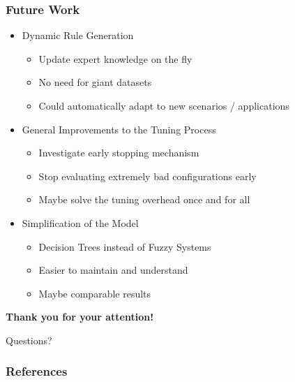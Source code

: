 \documentclass[
	10pt,
	t		%
]{beamer}
\begin{document}
\begin{frame}
	\frametitle{Future Work}
	\begin{itemize}
		\item Dynamic Rule Generation
		      \begin{itemize}
			      \item Update expert knowledge on the fly
			      \item No need for giant datasets
			      \item Could automatically adapt to new scenarios / applications
		      \end{itemize}
		\item General Improvements to the Tuning Process
		      \begin{itemize}
			      \item Investigate early stopping mechanism
			      \item Stop evaluating extremely bad configurations early
			      \item Maybe solve the tuning overhead once and for all
		      \end{itemize}
		\item Simplification of the Model
		      \begin{itemize}
			      \item Decision Trees instead of Fuzzy Systems
			      \item Easier to maintain and understand
			      \item Maybe comparable results
		      \end{itemize}
	\end{itemize}
\end{frame}


\begin{frame}
	\begin{center}
		\vspace{1cm}
		{\large \textbf{Thank you for your attention!}}
		
		\vspace{2cm}
		
		\Huge{Questions?}
	\end{center}
\end{frame}

\thispagestyle{empty}
\begin{frame}
	\frametitle{References}
	\footnotesize
	
	
\end{frame}
\end{document}
